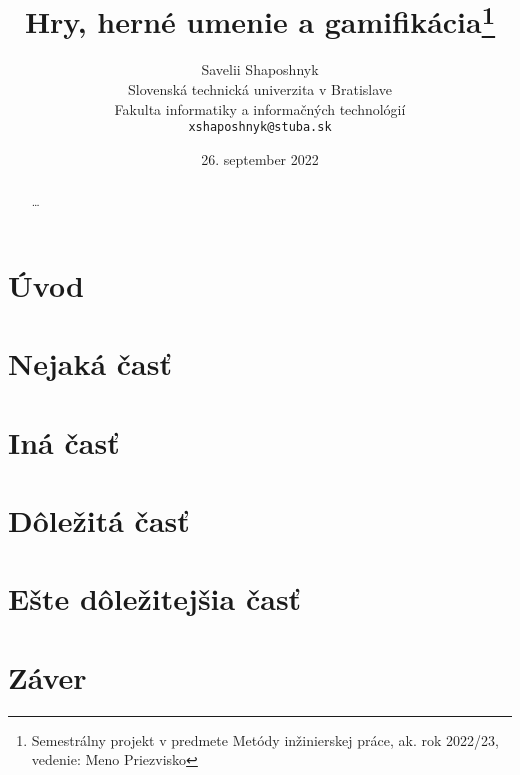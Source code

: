 \documentclass[10pt,twoside,slovak,a4paper]{article}
\title{Hry, herné umenie a gamifikácia\thanks{Semestrálny projekt v predmete Metódy inžinierskej práce, ak. rok 2022/23, vedenie: Meno Priezvisko}} %
\author{Savelii Shaposhnyk\\[2pt]
	{\small Slovenská technická univerzita v Bratislave}\\
	{\small Fakulta informatiky a informačných technológií}\\
	{\small \texttt{xshaposhnyk@stuba.sk}}
	}
\date{\small 26. september 2022} %
\begin{document}
\maketitle

\begin{abstract}
\ldots
\end{abstract}



\section{Úvod}

\section{Nejaká časť} \label{nejaka}


\section{Iná časť} \label{ina}


\section{Dôležitá časť} \label{dolezita}


\section{Ešte dôležitejšia časť} \label{dolezitejsia}

\section{Záver} \label{zaver} %






\end{document}
